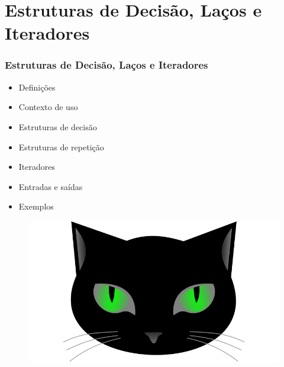 \section{Estruturas de Decisão, Laços e Iteradores}

\begin{frame}
\frametitle{Estruturas de Decisão, Laços e Iteradores}
\begin{minipage}{0.47\textwidth}
    \begin{itemize}
        \item Definições
        \item Contexto de uso
        \item Estruturas de decisão
        \item Estruturas de repetição
        \item Iteradores
        \item Entradas e saídas
        \item Exemplos
    \end{itemize}
\end{minipage}
\begin{minipage}{0.5\textwidth}
\begin{figure}[ht!]
\begin{center}
\includegraphics[width=1.2\textwidth, height=0.40\textheight]{figures/logo_picat_alex.jpg}
\end{center}
\end{figure}
\end{minipage}
\end{frame}

